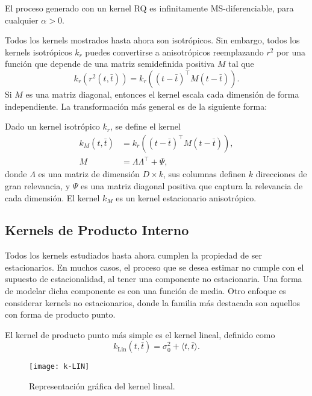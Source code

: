 \begin{proposition}
	El proceso generado con un kernel RQ es infinitamente MS-diferencia\-ble, para cualquier \(\alpha > 0\).
\end{proposition}

Todos los kernels mostrados hasta ahora son isotrópicos. Sin embargo, todos los kernels isotrópicos \(k_{r}\) puedes convertirse a anisotrópicos reemplazando \(r^{2}\) por una función que depende de una matriz semidefinida positiva \(M\) tal que
\begin{equation*}
	k_{r} \left(r^{2}(t, \bar{t})\right) = k_{r}\left((t-\bar{t})^{\top} M (t-\bar{t})\right).
\end{equation*}
Si \(M\) es una matriz diagonal, entonces el kernel escala cada dimensión de forma independiente. La transformación más general es de la siguiente forma:

\begin{proposition}
	Dado un kernel isotrópico \(k_{r}\), se define el kernel
	\begin{align*}
		k_{M} (t, \bar{t})	&= k_{r}\left((t - \bar{t})^{\top} M (t-\bar{t}) \right), \\
		M					&= \Lambda \Lambda^{\top} + \Psi,
	\end{align*}
	donde \(\Lambda\) es una matriz de dimensión \(D \times k\), sus columnas definen \(k\) direcciones de gran relevancia, y \(\Psi\) es una matriz diagonal positiva que captura la relevancia de cada dimensión. El kernel \(k_{M}\) es un kernel estacionario anisotrópico.
\end{proposition}

\subsection{Kernels de Producto Interno}

Todos los kernels estudiados hasta ahora cumplen la propiedad de ser estacionarios. En muchos casos, el proceso que se desea estimar no cumple con el supuesto de estacionalidad, al tener una componente no estacionaria. Una forma de modelar dicha componente es con una función de media. Otro enfoque es considerar kernels no estacionarios, donde la familia más destacada son aquellos con forma de producto punto.

El kernel de producto punto más simple es el kernel lineal, definido como
\[ k_{\mathrm{Lin}} (t, \bar{t}) = \sigma_{0}^{2} + \langle t, \bar{t}\rangle.\]

\begin{figure}[h]
	\centering
	\texttt{[image: k-LIN]}
	\caption{Representación gráfica del kernel lineal.}
\end{figure}

